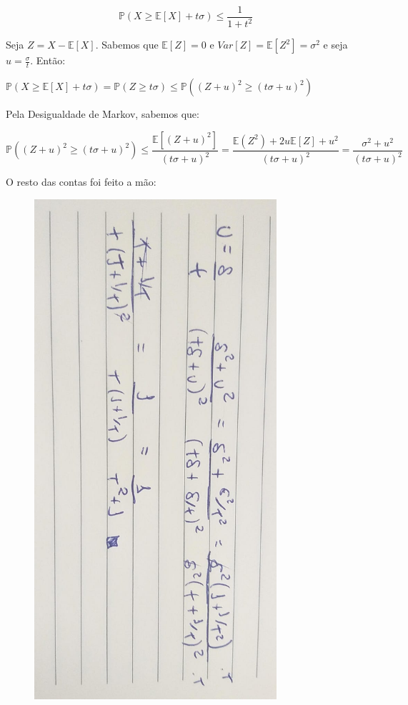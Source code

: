 \documentclass{article}
\begin{document}
\begin{itemize}
	      \[\mathbb{P}(X \geq \mathbb{E}[X] + t \sigma) \leq \frac{1}{1 + t^2}\]

	      Seja \(Z = X - \mathbb{E}[X]\). Sabemos que \(\mathbb{E}[Z] = 0\) e \(Var[Z] = \mathbb{E}[Z^2] = \sigma^2\)
	      e seja \(u = \frac{\sigma}{t}\). Então:

	      \(\mathbb{P}(X \geq \mathbb{E}[X] + t \sigma) = \mathbb{P}(Z \geq t \sigma) \leq \mathbb{P}((Z + u)^2 \geq (t \sigma + u)^2)\)

	      Pela Desigualdade de Markov, sabemos que:

	      \[\mathbb{P}((Z + u)^2 \geq (t \sigma + u)^2) \leq \frac{\mathbb{E}[(Z + u)^2]}{(t \sigma+ u)^2} = \frac{\mathbb{E}(Z^2) + 2u\mathbb{E}[Z] + u^2}{(t\sigma + u)^2} = \frac{\sigma^2 + u^2}{(t \sigma + u)^2}\]

	      O resto das contas foi feito a mão:

	      \begin{figure}[H]
		      \centering
		      \includegraphics[angle=90,origin=c,width=0.8\textwidth]{images/584.jpeg}
	      \end{figure}


\end{itemize}
\end{document}
